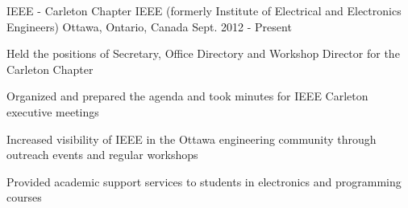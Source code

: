 

\begin{cventries}

  \cventry
    {IEEE - Carleton Chapter} %
    {IEEE (formerly Institute of Electrical and Electronics Engineers)} %
    {Ottawa, Ontario, Canada} %
    {Sept. 2012 - Present} %
    {
      \begin{cvitems} %
        \item {Held the positions of Secretary, Office Directory and Workshop Director for the Carleton Chapter}
        \item {Organized and prepared the agenda and took minutes for IEEE Carleton executive meetings}
        \item {Increased visibility of IEEE in the Ottawa engineering community through outreach events and regular workshops}
        \item {Provided academic support services to students in electronics and programming courses}
      \end{cvitems}
    }

\end{cventries}
